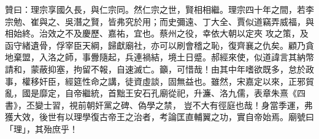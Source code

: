 \begin{pinyinscope}
 贊曰：理宗享國久長，與仁宗同。然仁宗之世，賢相相繼。理宗四十年之間，若李宗勉、崔與之、吳潛之賢，皆弗究於用；而史彌遠、丁大全、賈似道竊弄威福，與相始終。治效之不及慶歷、嘉祐，宜也。蔡州之役，幸依大朝以定夾
 攻之策，及函守緒遺骨，俘宰臣天綱，歸獻廟社，亦可以刷會稽之恥，復齊襄之仇矣。顧乃貪地棄盟，入洛之師，事釁隨起，兵連禍結，境土日蹙。郝經來使，似道諱言其納幣請和，蒙蔽抑塞，拘留不報，自速滅亡。籲，可惜哉！由其中年嗜欲既多，怠於政事，權移奸臣，經筵性命之講，徒資虛談，固無益也。雖然，宋嘉定以來，正邪貿亂，國是靡定，自帝繼統，首黜王安石孔廟從祀，升濂、洛九儒，表章朱熹《四書》，丕變士習，視前朝奸黨之碑、偽學之禁，
 豈不大有徑庭也哉！身當季運，弗獲大效，後世有以理學復古帝王之治者，考論匡直輔翼之功，實自帝始焉。廟號曰「理」，其殆庶乎！



\end{pinyinscope}